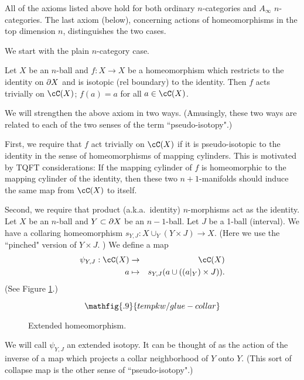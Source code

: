 
All of the axioms listed above hold for both ordinary $n$-categories and $A_\infty$ $n$-categories.
The last axiom (below), concerning actions of 
homeomorphisms in the top dimension $n$, distinguishes the two cases.

We start with the plain $n$-category case.

{Let $X$ be an $n$-ball and $f: X\to X$ be a homeomorphism which restricts
to the identity on $\partial X$ and is isotopic (rel boundary) to the identity.
Then $f$ acts trivially on $\cC(X)$; $f(a) = a$ for all $a\in \cC(X)$.}

We will strengthen the above axiom in two ways.
(Amusingly, these two ways are related to each of the two senses of the term
``pseudo-isotopy".)

First, we require that $f$ act trivially on $\cC(X)$ if it is pseudo-isotopic to the identity
in the sense of homeomorphisms of mapping cylinders.
This is motivated by TQFT considerations:
If the mapping cylinder of $f$ is homeomorphic to the mapping cylinder of the identity,
then these two $n{+}1$-manifolds should induce the same map from $\cC(X)$ to itself.

Second, we require that product (a.k.a.\ identity) $n$-morphisms act as the identity.
Let $X$ be an $n$-ball and $Y\subset\partial X$ be an $n{-}1$-ball.
Let $J$ be a 1-ball (interval).
We have a collaring homeomorphism $s_{Y,J}: X\cup_Y (Y\times J) \to X$.
(Here we use the ``pinched" version of $Y\times J$.
)
We define a map
\begin{eqnarray*}
	\psi_{Y,J}: \cC(X) &\to& \cC(X) \\
	a & \mapsto & s_{Y,J}(a \cup ((a|_Y)\times J)) .
\end{eqnarray*}
(See Figure \ref{glue-collar}.)
\begin{figure}[!ht]\begin{equation*}
\mathfig{.9}{tempkw/glue-collar}
\end{equation*}\caption{Extended homeomorphism.}\label{glue-collar}\end{figure}
We will call $\psi_{Y,J}$ an extended isotopy.
It can be thought of as the action of the inverse of
a map which projects a collar neighborhood of $Y$ onto $Y$.
(This sort of collapse map is the other sense of ``pseudo-isotopy".)

